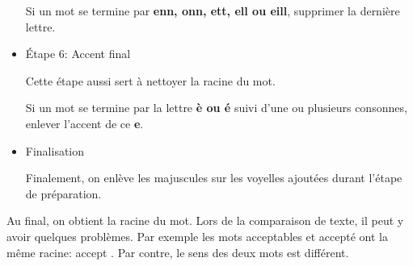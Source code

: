 \begin{itemize}
Si un mot se termine par \textbf{enn, onn, ett, ell ou eill}, supprimer la dernière lettre.

\item{Étape 6: Accent final}

Cette étape aussi sert \`a nettoyer la racine du mot.

Si un mot se termine par la lettre \textbf{è ou é} suivi d'une ou plusieurs consonnes, enlever l'accent de ce \textbf{e}.

\item{Finalisation}

Finalement, on enlève les majuscules sur les voyelles ajoutées durant l'étape de préparation.

\end{itemize}

Au final, on obtient la racine du mot.
Lors de la comparaison de texte, il peut y avoir quelques problèmes.
Par exemple les mots \og acceptables \fg{} et \og accepté \fg{} ont la même racine: \og accept \fg{}.
Par contre, le sens des deux mots est différent.


